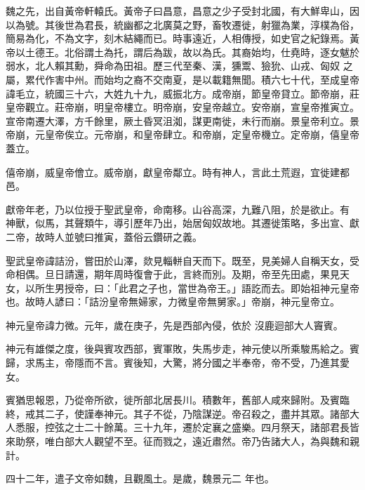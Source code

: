 
\begin{pinyinscope}

 魏之先，出自黃帝軒轅氏。黃帝子曰昌意，昌意之少子受封北國，有大鮮卑山，因以為號。其後世為君長，統幽都之北廣莫之野，畜牧遷徙，射獵為業，淳樸為俗，簡易為化，不為文字，刻木結繩而已。時事遠近，人相傳授，如史官之紀錄焉。黃帝以土德王。北俗謂土為托，謂后為跋，故以為氏。其裔始均，仕堯時，逐女魃於弱水，北人賴其勳，舜命為田祖。歷三代至秦、漢，獯鬻、獫狁、山戎、匈奴
 之屬，累代作害中州。而始均之裔不交南夏，是以載籍無聞。積六七十代，至成皇帝諱毛立，統國三十六，大姓九十九，威振北方。成帝崩，節皇帝貸立。節帝崩，莊皇帝觀立。莊帝崩，明皇帝樓立。明帝崩，安皇帝越立。安帝崩，宣皇帝推寅立。宣帝南遷大澤，方千餘里，厥土昏冥沮洳，謀更南徙，未行而崩。景皇帝利立。景帝崩，元皇帝俟立。元帝崩，和皇帝肆立。和帝崩，定皇帝機立。定帝崩，僖皇帝蓋立。



 僖帝崩，威皇帝儈立。威帝崩，獻皇帝鄰立。時有神人，言此土荒遐，宜徙建都邑。



 獻帝年老，乃以位授于聖武皇帝，命南移。山谷高深，九難八阻，於是欲止。有
 神獸，似馬，其聲類牛，導引歷年乃出，始居匈奴故地。其遷徙策略，多出宣、獻二帝，故時人並號曰推寅，蓋俗云鑽研之義。



 聖武皇帝諱詰汾，嘗田於山澤，欻見輜軿自天而下。既至，見美婦人自稱天女，受命相偶。旦日請還，期年周時復會于此，言終而別。及期，帝至先田處，果見天女，以所生男授帝，曰：「此君之子也，當世為帝王。」語訖而去。即始祖神元皇帝也。故時人諺曰：「詰汾皇帝無婦家，力微皇帝無舅家。」帝崩，神元皇帝立。



 神元皇帝諱力微。元年，歲在庚子，先是西部內侵，依於
 沒鹿迴部大人竇賓。



 神元有雄傑之度，後與賓攻西部，賓軍敗，失馬步走，神元使以所乘駿馬給之。賓歸，求馬主，帝隱而不言。賓後知，大驚，將分國之半奉帝，帝不受，乃進其愛女。



 賓猶思報恩，乃從帝所欲，徙所部北居長川。積數年，舊部人咸來歸附。及賓臨終，戒其二子，使謹奉神元。其子不從，乃陰謀逆。帝召殺之，盡并其眾。諸部大人悉服，控弦之士二十餘萬。三十九年，遷於定襄之盛樂。四月祭天，諸部君長皆來助祭，唯白部大人觀望不至。征而戮之，遠近肅然。帝乃告諸大人，為與魏和親計。



 四十二年，遣子文帝如魏，且觀風土。是歲，魏景元二
 年也。




\end{pinyinscope}
